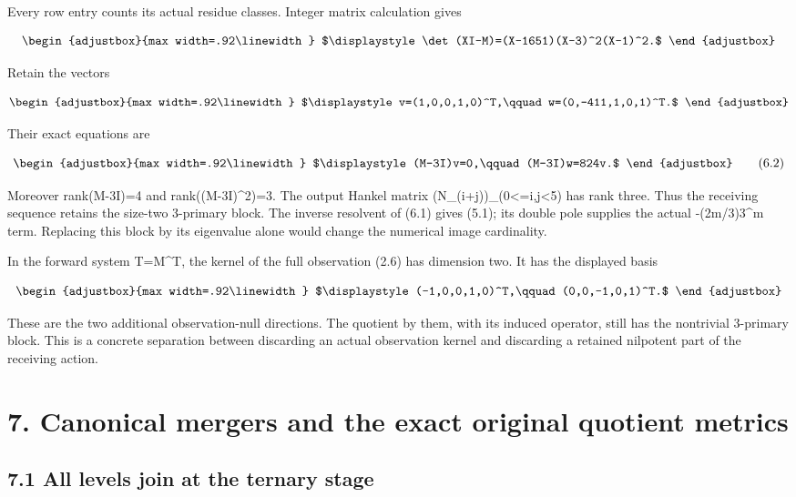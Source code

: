 Every row entry counts its actual residue classes. Integer matrix calculation gives

\[
\begin{adjustbox}{max width=.92\linewidth}
$\displaystyle \det(XI-M)=(X-1651)(X-3)^2(X-1)^2.$
\end{adjustbox}
\]

Retain the vectors

\[
\begin{adjustbox}{max width=.92\linewidth}
$\displaystyle v=(1,0,0,1,0)^T,\qquad w=(0,-411,1,0,1)^T.$
\end{adjustbox}
\]

Their exact equations are

\[
\begin{adjustbox}{max width=.92\linewidth}
$\displaystyle (M-3I)v=0,\qquad (M-3I)w=824v.$
\end{adjustbox}
\tag{6.2}
\]

Moreover rank(M-3I)=4 and rank((M-3I)\^{}2)=3. The output Hankel matrix (N\_(i+j))\_(0\textless=i,j\textless5) has rank three. Thus the receiving sequence retains the size-two 3-primary block. The inverse resolvent of (6.1) gives (5.1); its double pole supplies the actual -(2m/3)3\^{}m term. Replacing this block by its eigenvalue alone would change the numerical image cardinality.

In the forward system T=M\^{}T, the kernel of the full observation (2.6) has dimension two. It has the displayed basis

\[
\begin{adjustbox}{max width=.92\linewidth}
$\displaystyle (-1,0,0,1,0)^T,\qquad(0,0,-1,0,1)^T.$
\end{adjustbox}
\]

These are the two additional observation-null directions. The quotient by them, with its induced operator, still has the nontrivial 3-primary block. This is a concrete separation between discarding an actual observation kernel and discarding a retained nilpotent part of the receiving action.

\section{7. Canonical mergers and the exact original quotient metrics}\label{n20-canonical-mergers-and-the-exact-original-quotient-metrics}

\subsection{7.1 All levels join at the ternary stage}\label{n20-all-levels-join-at-the-ternary-stage}

